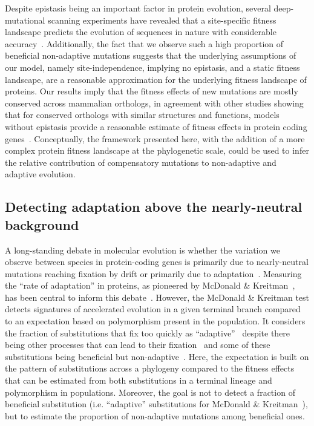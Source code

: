 \documentclass[10pt,letterpaper]{article}
\begin{document}
Despite epistasis being an important factor in protein evolution, several deep-mutational scanning experiments have revealed that a site-specific fitness landscape predicts the evolution of sequences in nature with considerable accuracy~\cite{ashenberg_mutational_2013, doud_sitespecific_2015, bloom_identification_2017}.
Additionally, the fact that we observe such a high proportion of beneficial non-adaptive mutations suggests that the underlying assumptions of our model, namely site-independence, implying no epistasis, and a static fitness landscape, are a reasonable approximation for the underlying fitness landscape of proteins.
Our results imply that the fitness effects of new mutations are mostly conserved across mammalian orthologs, in agreement with other studies showing that for conserved orthologs with similar structures and functions, models without epistasis provide a reasonable estimate of fitness effects in protein coding genes~\cite{youssef_consequences_2020, vigue_deciphering_2022}.
Conceptually, the framework presented here, with the addition of a more complex protein fitness landscape at the phylogenetic scale, could be used to infer the relative contribution of compensatory mutations to non-adaptive and adaptive evolution.

\subsection*{Detecting adaptation above the nearly-neutral background}

A long-standing debate in molecular evolution is whether the variation we observe between species in protein-coding genes is primarily due to nearly-neutral mutations reaching fixation by drift or primarily due to adaptation~\cite{kimura_evolutionary_1968,ohta_nearly_1992,gillespie_substitution_1994,jensen_importance_2019}.
Measuring the ``rate of adaptation'' in proteins, as pioneered by McDonald \& Kreitman~\cite{mcdonald_adaptative_1991}, has been central to inform this debate~\cite{galtier_half_2024}.
However, the McDonald \& Kreitman test detects signatures of accelerated evolution in a given terminal branch compared to an expectation based on polymorphism present in the population. It considers the fraction of substitutions that fix too quickly as ``adaptive''~\cite{mcdonald_adaptative_1991, smith_adaptive_2002, welch_estimating_2006} despite there being other processes that can lead to their fixation~\cite{galtier_adaptation_2007,rousselle_influence_2019,joseph_increased_2024a} and some of these substitutions being beneficial but non-adaptive~\cite{hartl_compensatory_1996, charlesworth_other_2007, mustonen_fitness_2009, jones_shifting_2017}.
Here, the expectation is built on the pattern of substitutions across a phylogeny compared to the fitness effects that can be estimated from both substitutions in a terminal lineage and polymorphism in populations.
Moreover, the goal is not to detect a fraction of beneficial substitution (i.e. ``adaptive'' substitutions for McDonald \& Kreitman~\cite{mcdonald_adaptative_1991}), but to estimate the proportion of non-adaptive mutations among beneficial ones.
\end{document}
